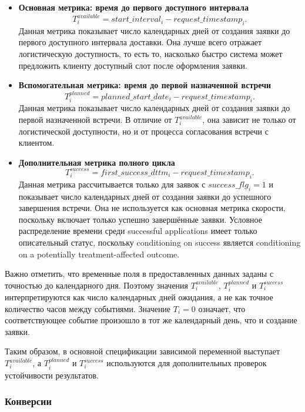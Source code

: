 \documentclass[14pt,a4paper]{extarticle}
\begin{document}
\begin{itemize}
    \item \textbf{Основная метрика: время до первого доступного интервала}
    \[
        T^{available}_i = start\_interval_i - request\_timestamp_i.
    \]
    Данная метрика показывает число календарных дней от создания заявки до первого доступного интервала доставки. Она лучше всего отражает логистическую доступность, то есть то, насколько быстро система может предложить клиенту доступный слот после оформления заявки.

    \item \textbf{Вспомогательная метрика: время до первой назначенной встречи}
    \[
        T^{planned}_i = planned\_start\_date_i - request\_timestamp_i.
    \]
    Данная метрика показывает число календарных дней от создания заявки до первой назначенной встречи. В отличие от \(T^{available}_i\), она зависит не только от логистической доступности, но и от процесса согласования встречи с клиентом.

    \item \textbf{Дополнительная метрика полного цикла}
    \[
        T^{success}_i = first\_success\_dttm_i - request\_timestamp_i.
    \]
    Данная метрика рассчитывается только для заявок с \(success\_flg_i = 1\) и показывает число календарных дней от создания заявки до успешного завершения встречи. Она не используется как основная метрика скорости, поскольку включает только успешно завершённые заявки. Условное распределение времени среди successful applications имеет только описательный статус, поскольку conditioning on success является conditioning on a potentially treatment-affected outcome.
\end{itemize}

Важно отметить, что временные поля в предоставленных данных заданы с точностью до календарного дня. Поэтому значения \(T^{available}_i\), \(T^{planned}_i\) и \(T^{success}_i\) интерпретируются как число календарных дней ожидания, а не как точное количество часов между событиями. Значение \(T_i=0\) означает, что соответствующее событие произошло в тот же календарный день, что и создание заявки.

Таким образом, в основной спецификации зависимой переменной выступает \(T^{available}_i\), а \(T^{planned}_i\) и \(T^{success}_i\) используются для дополнительных проверок устойчивости результатов.

\subsubsection{Конверсии}
\end{document}

